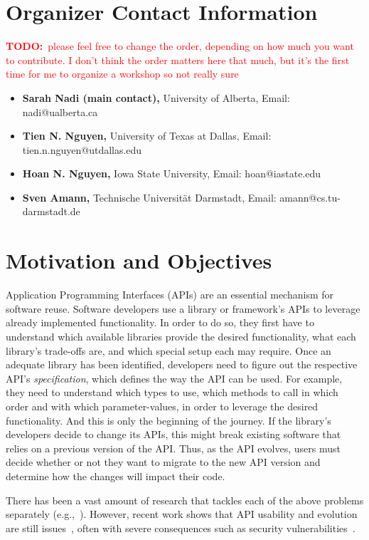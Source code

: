 \documentclass[10pt, conference]{IEEEtran}
\newcommand{\todo}[1]{{\textcolor{red}{\textbf{TODO:}~#1}}}
\begin{document}
\section{Organizer Contact Information}
\todo{please feel free to change the order, depending on how much you want to contribute. I don't think the order matters here that much, but it's the first time for me to organize a workshop so not really sure}
\begin{itemize}
\item \textbf{Sarah Nadi (main contact),} University of Alberta, Email: nadi@ualberta.ca
\item \textbf{Tien N. Nguyen,} University of Texas at Dallas, Email: tien.n.nguyen@utdallas.edu
\item \textbf{Hoan N. Nguyen,} Iowa State University, Email: hoan@iastate.edu
\item \textbf{Sven Amann,} Technische Universit\"{a}t Darmstadt, Email: amann@cs.tu-darmstadt.de
\end{itemize}

\section{Motivation and Objectives}
Application Programming Interfaces (APIs) are an essential mechanism for software reuse. Software developers use a library or framework's APIs to leverage already implemented functionality. In order to do so, they first have to understand which available libraries provide the desired functionality, what each library's trade-offs are, and which special setup each may require. Once an adequate library has been identified, developers need to figure out the respective API's \textit{specification}, which defines the way the API can be used. For example, they need to understand which types to use, which methods to call in which order and with which parameter-values, in order to leverage the desired functionality. And this is only the beginning of the journey. If the library's developers decide to change its APIs, this might break existing software that relies on a previous version of the API. Thus, as the API evolves, users must decide whether or not they want to migrate to the new API version and determine how the changes will impact their code.

There has been a vast amount of research that tackles each of the above problems separately (e.g.,~\cite{Subramanian:2014,RobillardInferenceSurvey,RobillardLearn09, NNP+09, ThungLibRec}). However, recent work shows that API usability and evolution are still issues~\cite{NKMB16, BKHT:FSE16, SunshineAPIProtocol}, often with severe consequences such as security vulnerabilities~\cite{EgeleBFK13}. 
\end{document}
